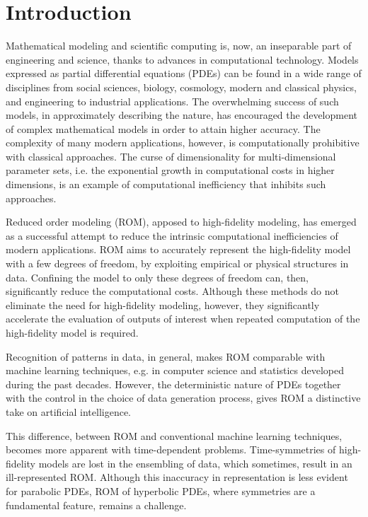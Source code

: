 \chapter{Introduction}
Mathematical modeling and scientific computing is, now, an inseparable part of engineering and science, thanks to advances in computational technology. Models expressed as partial differential equations (PDEs) can be found in a wide range of disciplines from social sciences, biology, cosmology, modern and classical physics, and engineering to industrial applications. The overwhelming success of such models, in approximately describing the nature, has encouraged the development of complex mathematical models in order to attain higher accuracy. The complexity of many modern applications, however, is computationally prohibitive with classical approaches. The curse of dimensionality for multi-dimensional parameter sets, i.e. the exponential growth in computational costs in higher dimensions, is an example of computational inefficiency that inhibits such approaches.

Reduced order modeling (ROM), apposed to high-fidelity modeling, has emerged as a successful attempt to reduce the intrinsic computational inefficiencies of modern applications. ROM aims to accurately represent the high-fidelity model with a few degrees of freedom, by exploiting empirical or physical structures in data. Confining the model to only these degrees of freedom can, then, significantly reduce the computational costs. Although these methods do not eliminate the need for high-fidelity modeling, however, they significantly accelerate the evaluation of outputs of interest when repeated computation of the high-fidelity model is required.


Recognition of patterns in data, in general, makes ROM comparable with machine learning techniques, e.g. in computer science and statistics developed during the past decades. However, the deterministic nature of PDEs together with the control in the choice of data generation process, gives ROM a distinctive take on artificial intelligence. 

This difference, between ROM and conventional machine learning techniques, becomes more apparent with time-dependent problems. Time-symmetries of high-fidelity models are lost in the ensembling of data, which sometimes, result in an ill-represented ROM. Although this inaccuracy in representation is less evident for parabolic PDEs, ROM of hyperbolic PDEs, where symmetries are a fundamental feature, remains a challenge.

